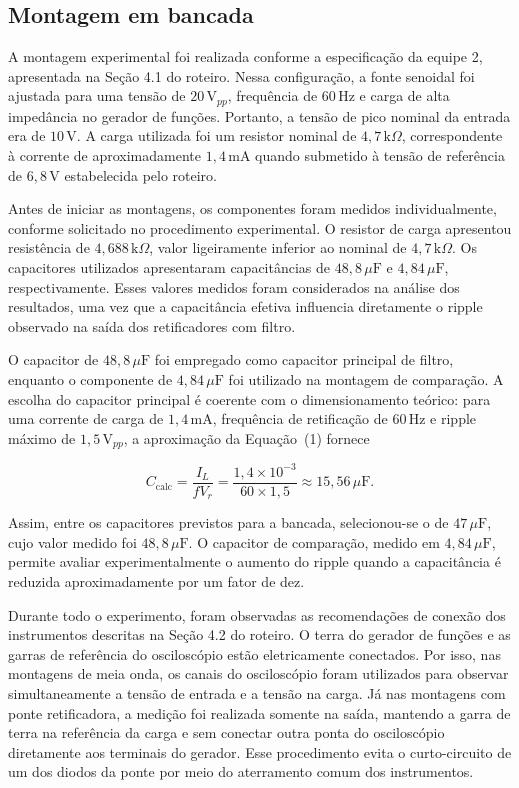 \documentclass[11pt,a4paper]{article}
\begin{document}
\subsection{Montagem em bancada}

A montagem experimental foi realizada conforme a especificação da equipe 2, apresentada na Seção 4.1 do roteiro. Nessa configuração, a fonte senoidal foi ajustada para uma tensão de $20\,\text{V}_{pp}$, frequência de $60\,\text{Hz}$ e carga de alta impedância no gerador de funções. Portanto, a tensão de pico nominal da entrada era de $10\,\text{V}$. A carga utilizada foi um resistor nominal de $4{,}7\,\text{k}\Omega$, correspondente à corrente de aproximadamente $1{,}4\,\text{mA}$ quando submetido à tensão de referência de $6{,}8\,\text{V}$ estabelecida pelo roteiro.

Antes de iniciar as montagens, os componentes foram medidos individualmente, conforme solicitado no procedimento experimental. O resistor de carga apresentou resistência de $4{,}688\,\text{k}\Omega$, valor ligeiramente inferior ao nominal de $4{,}7\,\text{k}\Omega$. Os capacitores utilizados apresentaram capacitâncias de $48{,}8\,\mu\text{F}$ e $4{,}84\,\mu\text{F}$, respectivamente. Esses valores medidos foram considerados na análise dos resultados, uma vez que a capacitância efetiva influencia diretamente o ripple observado na saída dos retificadores com filtro.

O capacitor de $48{,}8\,\mu\text{F}$ foi empregado como capacitor principal de filtro, enquanto o componente de $4{,}84\,\mu\text{F}$ foi utilizado na montagem de comparação. A escolha do capacitor principal é coerente com o dimensionamento teórico: para uma corrente de carga de $1{,}4\,\text{mA}$, frequência de retificação de $60\,\text{Hz}$ e ripple máximo de $1{,}5\,\text{V}_{pp}$, a aproximação da Equação~(1) fornece

\[
C_{\mathrm{calc}} =
\frac{I_L}{fV_r}
=
\frac{1{,}4\times10^{-3}}
{60\times1{,}5}
\approx 15{,}56\,\mu\text{F}.
\]

Assim, entre os capacitores previstos para a bancada, selecionou-se o de $47\,\mu\text{F}$, cujo valor medido foi $48{,}8\,\mu\text{F}$. O capacitor de comparação, medido em $4{,}84\,\mu\text{F}$, permite avaliar experimentalmente o aumento do ripple quando a capacitância é reduzida aproximadamente por um fator de dez.

Durante todo o experimento, foram observadas as recomendações de conexão dos instrumentos descritas na Seção 4.2 do roteiro. O terra do gerador de funções e as garras de referência do osciloscópio estão eletricamente conectados. Por isso, nas montagens de meia onda, os canais do osciloscópio foram utilizados para observar simultaneamente a tensão de entrada e a tensão na carga. Já nas montagens com ponte retificadora, a medição foi realizada somente na saída, mantendo a garra de terra na referência da carga e sem conectar outra ponta do osciloscópio diretamente aos terminais do gerador. Esse procedimento evita o curto-circuito de um dos diodos da ponte por meio do aterramento comum dos instrumentos.
\end{document}
